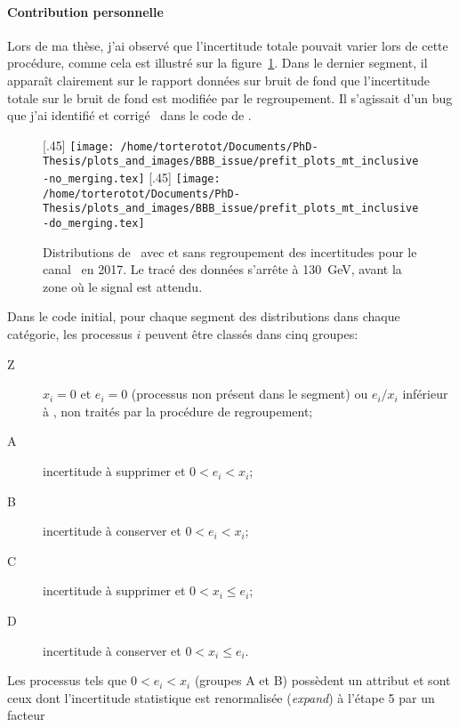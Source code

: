 \paragraph{Contribution personnelle}
Lors de ma thèse, j'ai observé que l'incertitude totale pouvait varier lors de cette procédure, comme cela est illustré sur la figure~\ref{fig-BBB_issue_2017_mt}.
Dans le dernier segment, il apparaît clairement sur le rapport données sur bruit de fond que l'incertitude totale sur le bruit de fond est modifiée par le regroupement.
Il s'agissait d'un bug que j'ai identifié et corrigé~\cite{BBB_PR} dans le code de \COMBINE.
\begin{figure}[h]
\centering

[.45\textwidth]
{\LARGE\texttt{[image: /home/torterotot/Documents/PhD-Thesis/plots\_and\_images/BBB\_issue/prefit\_plots\_mt\_inclusive-no\_merging.tex]}}
\hfill
{}[.45\textwidth]
{\LARGE\texttt{[image: /home/torterotot/Documents/PhD-Thesis/plots\_and\_images/BBB\_issue/prefit\_plots\_mt\_inclusive-do\_merging.tex]}}

\caption[Distributions de \mTtot\ avec et sans regroupement des incertitudes.]{Distributions de \mTtot\ avec et sans regroupement des incertitudes pour le canal \mu\tauh\ en 2017. Le tracé des données s'arrête à \SI{130}{\GeV}, avant la zone où le signal est attendu.}
\label{fig-BBB_issue_2017_mt}
\end{figure}
\par
Dans le code initial,
pour chaque segment des distributions dans chaque catégorie,
les processus $i$ peuvent être classés dans cinq groupes:
\begin{description}
\item[Z] $x_i = 0$ et $e_i = 0$ (processus non présent dans le segment) ou $e_i/x_i$ inférieur à , non traités par la procédure de regroupement;
\item[A] incertitude à supprimer et $0 < e_i < x_i$;
\item[B] incertitude à conserver et $0 < e_i < x_i$;
\item[C] incertitude à supprimer et $0 < x_i \leq e_i$;
\item[D] incertitude à conserver et $0 < x_i \leq e_i$.
\end{description}
Les processus tels que $0 < e_i < x_i$ (groupes A et B)
possèdent un attribut 
et sont ceux dont l'incertitude statistique est renormalisée (\emph{expand}) à l'étape 5 par un facteur
